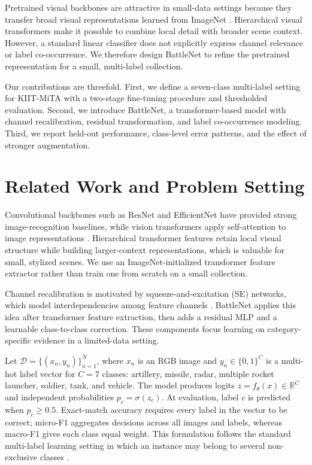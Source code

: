 \documentclass[conference]{IEEEtran}
\newcommand{\dataset}{KIIT-MiTA}
\newcommand{\battlenet}{BattleNet}
\begin{document}
Pretrained visual backbones are attractive in small-data settings because they transfer broad visual representations learned from ImageNet \cite{russakovsky2015imagenet}. Hierarchical visual transformers make it possible to combine local detail with broader scene context. However, a standard linear classifier does not explicitly express channel relevance or label co-occurrence. We therefore design BattleNet to refine the pretrained representation for a small, multi-label collection.

Our contributions are threefold. First, we define a seven-class multi-label setting for \dataset{} with a two-stage fine-tuning procedure and thresholded evaluation. Second, we introduce \battlenet{}, a transformer-based model with channel recalibration, residual transformation, and label co-occurrence modeling. Third, we report held-out performance, class-level error patterns, and the effect of stronger augmentation.

\section{Related Work and Problem Setting}
Convolutional backbones such as ResNet \cite{he2016resnet} and EfficientNet \cite{tan2019efficientnet} have provided strong image-recognition baselines, while vision transformers apply self-attention to image representations \cite{dosovitskiy2021vit}. Hierarchical transformer features retain local visual structure while building larger-context representations, which is valuable for small, stylized scenes. We use an ImageNet-initialized transformer feature extractor rather than train one from scratch on a small collection.

Channel recalibration is motivated by squeeze-and-excitation (SE) networks, which model interdependencies among feature channels \cite{hu2018senet}. BattleNet applies this idea after transformer feature extraction, then adds a residual MLP and a learnable class-to-class correction. These components focus learning on category-specific evidence in a limited-data setting.

Let $\mathcal{D}=\{(x_n,y_n)\}_{n=1}^{N}$, where $x_n$ is an RGB image and $y_n\in\{0,1\}^{C}$ is a multi-hot label vector for $C=7$ classes: artillery, missile, radar, multiple rocket launcher, soldier, tank, and vehicle. The model produces logits $z=f_\theta(x)\in\mathbb{R}^{C}$ and independent probabilities $p_c=\sigma(z_c)$. At evaluation, label $c$ is predicted when $p_c\geq0.5$. Exact-match accuracy requires every label in the vector to be correct; micro-F1 aggregates decisions across all images and labels, whereas macro-F1 gives each class equal weight.
This formulation follows the standard multi-label learning setting in which an instance may belong to several non-exclusive classes \cite{tsoumakas2010multilabel}.
\end{document}
